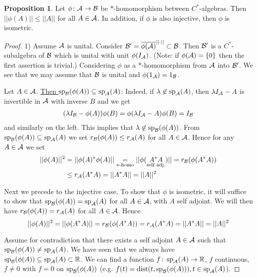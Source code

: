 \documentclass[10pt,english,a4paper]{article}
\theoremstyle{definition}
\newtheorem*{proposition}{Proposition}
\DeclareMathOperator{\Sp}{sp}
\begin{document}
\begin{proposition}
    Let $\phi \colon \mathcal{A}\to\mathcal{B}$ be $*$-homomorphism between $C^*$-algebras. 
Then $||\phi(A)|| \leq ||A||$ for all $A \in \mathcal{A}$. In addition, 
if $\phi$ is also injective, then $\phi$ is isometric.
\end{proposition}
\begin{proof}
    1) Assume $\mathcal{A}$ is unital. Consider $\mathcal{B}' = \overline{\phi(\mathcal{A})}^{||\cdot||} \subset \mathcal{B}$.
    Then $\mathcal{B}'$ is a $C^*$-subalgebra of $\mathcal{B}$ which is unital with unit $\phi(I_{\mathcal{A}})$.
    (Note: if $\phi(\mathcal{A})  = \{0\}$ then the first assertion is trivial.) Considering 
    $\phi$ as a $*$-homomorphism from $\mathcal{A}$ into $\mathcal{B}'$. We see that we may assume that 
$\mathcal{B}$ is unital and $\phi(1_{\mathcal{A}}) = 1_{\mathcal{B}}$. 

Let $A \in \mathcal{A}$. \ul{Then $\Sp_{\Bs}(\phi(A))\subseteq \Sp_{\As}(A)$}:
Indeed, if $\la \not\in \Sp_{\As}(A)$, then $\lambda I_{\mathcal{A}} - A$ is invertible in 
$\mathcal{A}$ with inverse $B$ and we get 
\begin{align*}
    (\lambda I_{\mathcal{B}} - \phi(A) )\phi(B) = \phi(\lambda I_{\mathcal{A}} - A)\phi(B) = I_{\mathcal{B}}
\end{align*}
and similarly on the left. This implies that $\la \not \in \Sp_{\Bs}(\phi(A))$. 
From $\Sp_{\Bs}(\phi(A))\subseteq \Sp_{\As}(A)$ we set 
$r_{\mathcal{B}} (\phi(A)) \leq r_{\mathcal{A}}(A)$ for all $A \in \mathcal{A}$. Hence for any $A \in \mathcal{A}$
we set 
\begin{align*}
    ||\phi(A)||^2 &= ||\phi(A)^*\phi(A)|| \underset{*\text{-homo}}{=}
    ||\phi(\underset{\text{self adj.}}{A^*A})|| = r_{\mathcal{B}}(\phi(A^*A)) \\
    &\leq r_{\mathcal{A}}(A^*A) = ||A^*A|| = ||A||^2
\end{align*}

Next we precede to the injective case. To show that $\phi$ is isometric, it will 
suffice to show that $\Sp_{\Bs}(\phi(A)) = \Sp_{\As}(A)$ for all $A \in \mathcal{A}$, with $A$ self adjoint.
We will then have $r_{\mathcal{B}}(\phi(A)) = r_{\mathcal{A}}(A)$ for all $A \in \mathcal{A}$. Hence 
\[||\phi(A)||^2 = ||\phi(A^*A)|| = r_{\mathcal{B}}(\phi(A^*A)) = r_{\mathcal{A}}(A^*A) 
= ||A^*A|| = ||A||^2 \]

Assume for contradiction that there exists a self adjoint $A \in \mathcal{A}$ such that 
$\Sp_{\Bs}(\phi(A)) \neq \Sp_{\As}(A)$. We have seen that we always have 
$\Sp_{\Bs}(\phi(A)) \subseteq \Sp_{\As}(A) \subset \R$. 
We can find a function $f \colon \Sp_{\As}(A) \to \R$, $f$ continuous, $f \neq 0$
with $f=0$ on $\Sp_{\Bs}(\phi(A))$ (e.g. $f(t) = \text{dist}(t, \Sp_{\Bs}(\phi(A))), t \in \Sp_{\As}(A)$).


\end{proof}
\end{document}
